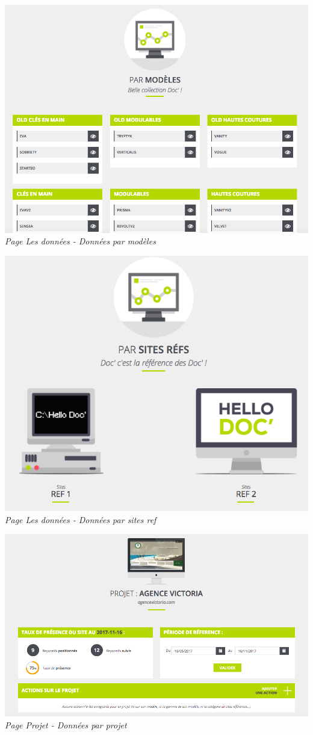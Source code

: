 \documentclass[12pt]{article}
\begin{document}
\begin{appendix}
\begin{center}
    \includegraphics[width = 15cm]{modelData.png}
    \textit{Page Les données - Données par modèles}
    
    \includegraphics[width = 15cm]{siteRefData.png}
    \textit{Page Les données - Données par sites ref}
    
    \includegraphics[width = 15cm]{projetData.png}
    \textit{Page Projet - Données par projet}
    

\end{center}
\end{appendix}
\end{document}
